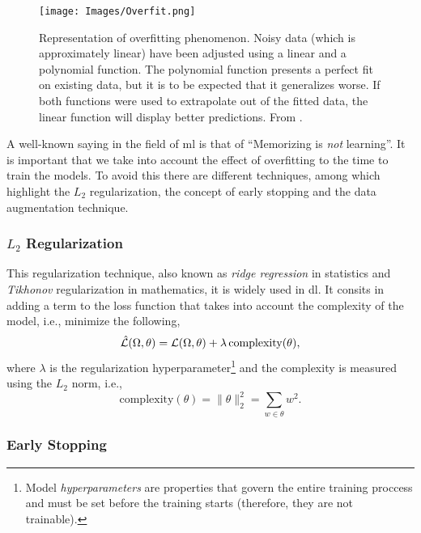 \begin{figure}[ht]
  \centering
  \texttt{[image: Images/Overfit.png]}
  \caption[Representation of the overfitting phenomenon.]{Representation of
    overfitting phenomenon. Noisy data (which is approximately linear) have
    been adjusted using a linear and a polynomial function. The polynomial
    function presents a perfect fit on existing data, but it is to be expected
    that it generalizes worse. If both functions were used to extrapolate out
    of the fitted data, the linear function will display better
    predictions. From .}\label{fig:overfit}
\end{figure}

A well-known saying in the field of \gls{ml} is that of ``Memorizing is
\emph{not} learning''. It is important that we take into account the effect of
overfitting to the time to train the models. To avoid this there are different
techniques, among which highlight the \(L_2\) regularization, the concept of
early stopping and the data augmentation technique.

\subsubsection{\(L_2\) Regularization}

This regularization technique, also known as \emph{ridge
  regression} in statistics and
\emph{Tikhonov} regularization in mathematics, it is
widely used in \gls{dl}. It consits in adding a term to the loss function that
takes into account the complexity of the model, i.e., minimize the following,
\begin{equation}
  \hat{\mathcal{L}}(\Omega, \theta) =
  \mathcal{L}(\Omega, \theta) + \lambda\,\text{complexity}(\theta),
\end{equation}
where \(\lambda\) is the regularization hyperparameter\footnote{Model
  \emph{hyperparameters} are properties that govern the entire training
  proccess and must be set before the training starts (therefore, they are not
  trainable).} and the complexity is measured using the
\(L_2\) norm, i.e.,
\begin{equation}
  \text{complexity}(\theta) = \lVert\theta\rVert_2^2 = \sum_{w \in \theta} w^2.
\end{equation}

\subsubsection{Early Stopping}

